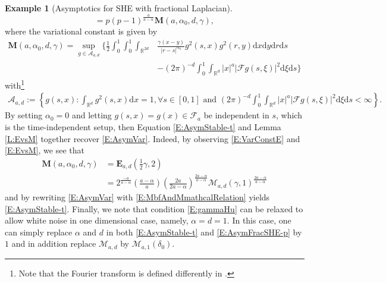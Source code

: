\documentclass[a4paper,11pt]{article}
\numberwithin{equation}{section}
\numberwithin{equation}{section}
\theoremstyle{plain}
\theoremstyle{definition}
\newtheorem{example}[theorem]{Example}
\newcommand{\ud}{\ensuremath{\mathrm{d} }}
\newcommand{\R}{\mathbb{R}}
\begin{document}
\begin{example}[Asymptotics for SHE with fractional Laplacian]
\begin{equation}
    = p(p-1)^{\frac{a}{a-\alpha}}\textbf{M}(a,\alpha_0,d,\gamma),
  \end{equation}
  where the variational constant is given by
  \begin{align*}
    \textbf{M}(a,\alpha_0,d,\gamma) = \sup_{g \in \mathcal{A}_{a,d}} \bigg\{ \frac{1}{2} \int_0^1\int_0^1 \int_{\R^{2d}}
    & \frac{\gamma(x-y)}{|r-s|^{\alpha_0}}g^2(s,x)g^2(r,y)  \ud x \ud y \ud r \ud s \\
    & - (2\pi)^{-d} \int_0^1 \int_{\R^d} |x|^a |\mathcal{F}g(s,\xi)|^2 \ud \xi \ud s \bigg\}
  \end{align*}
  with\footnote{Note that the Fourier transform is defined differently in \cite{CHSS18}.}
  \begin{align*}
    \mathcal{A}_{a,d} := \left\{ g(s,x) : \int_{\R^d} g^2(s,x) \ud x = 1, \forall s \in [0,1] \text{ and }
    (2\pi)^{-d} \int_0^1 \int_{\R^d} |x|^a |\mathcal{F}g(s,\xi)|^2 \ud \xi \ud s < \infty \right\}.
  \end{align*}
  By setting $\alpha_0=0$ and letting $g(s,x)=g(x) \in \mathcal{F}_a$ be independent in $s$, which
  is the time-independent setup, then Equation \eqref{E:AsymStable-t} and Lemma \ref{L:EvsM}
  together recover \eqref{E:AsymVar}. Indeed, by observing \eqref{E:VarConstE} and \eqref{E:EvsM},
  we see that
  \begin{align}
    \textbf{M}(a,\alpha_0,d,\gamma)
    & = \mathbf{E}_{a,d}\left(\frac{1}{2}\gamma,2\right) \nonumber \\
    & = 2^{\frac{-a}{a-\alpha}}\left(\frac{a-\alpha}{a}\right)\left( \frac{2a}{2a-\alpha} \right)^{\frac{2a-\alpha}{a-\alpha}}\mathcal{M}_{a,d}
    \left(\gamma,1\right)^{\frac{2a-\alpha}{a-\alpha}} \label{E:MbfAndMmathcalRelation}
  \end{align}
  and by rewriting \eqref{E:AsymVar} with \eqref{E:MbfAndMmathcalRelation} yields
  \eqref{E:AsymStable-t}. Finally, we note that condition \eqref{E:gammaHu} can be relaxed to allow
  white noise in one dimensional case, namely, $\alpha=d=1$. In this case, one can simply replace
  $\alpha$ and $d$ in both \eqref{E:AsymStable-t} and \eqref{E:AsymFracSHE-p} by $1$ and in addition
  replace $\mathcal{M}_{a,d}$ by $\mathcal{M}_{a ,1}(\delta_0)$.
\end{example}
\end{document}
